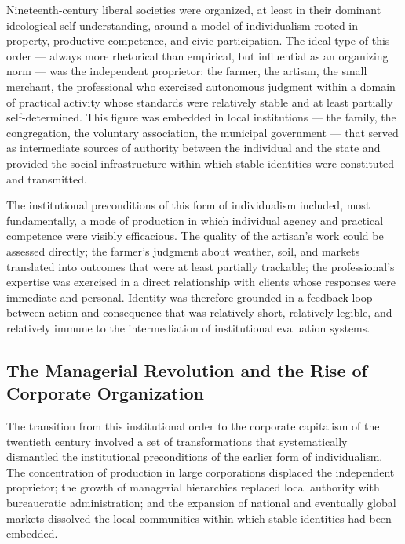 \documentclass[12pt]{memoir}
\begin{document}
Nineteenth-century liberal societies were organized, at least in their dominant ideological
self-understanding, around a model of individualism rooted in property, productive
competence, and civic participation. The ideal type of this order — always more rhetorical
than empirical, but influential as an organizing norm — was the independent proprietor: the
farmer, the artisan, the small merchant, the professional who exercised autonomous judgment
within a domain of practical activity whose standards were relatively stable and at least
partially self-determined. This figure was embedded in local institutions — the family, the
congregation, the voluntary association, the municipal government — that served as
intermediate sources of authority between the individual and the state and provided the
social infrastructure within which stable identities were constituted and transmitted.

The institutional preconditions of this form of individualism included, most fundamentally,
a mode of production in which individual agency and practical competence were visibly
efficacious. The quality of the artisan's work could be assessed directly; the farmer's
judgment about weather, soil, and markets translated into outcomes that were at least
partially trackable; the professional's expertise was exercised in a direct relationship
with clients whose responses were immediate and personal. Identity was therefore grounded
in a feedback loop between action and consequence that was relatively short, relatively
legible, and relatively immune to the intermediation of institutional evaluation systems.

\subsection{The Managerial Revolution and the Rise of Corporate Organization}

The transition from this institutional order to the corporate capitalism of the twentieth
century involved a set of transformations that systematically dismantled the institutional
preconditions of the earlier form of individualism. The concentration of production in
large corporations displaced the independent proprietor; the growth of managerial
hierarchies replaced local authority with bureaucratic administration; and the expansion of
national and eventually global markets dissolved the local communities within which stable
identities had been embedded.
\end{document}

